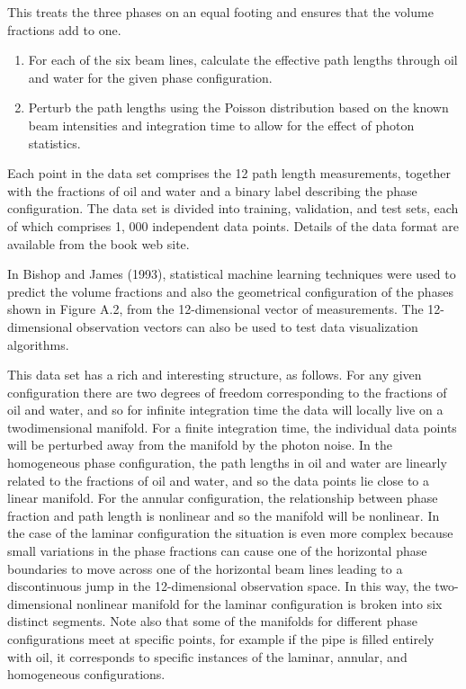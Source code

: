 \documentclass[
  10
]{article}
\begin{document}
This treats the three phases on an equal footing and ensures that the
volume fractions add to one.

\begin{enumerate}
\def\labelenumi{\arabic{enumi}.}
\setcounter{enumi}{2}
\item
  For each of the six beam lines, calculate the effective path lengths
  through oil and water for the given phase configuration.
\item
  Perturb the path lengths using the Poisson distribution based on the
  known beam intensities and integration time to allow for the effect of
  photon statistics.
\end{enumerate}

Each point in the data set comprises the 12 path length measurements,
together with the fractions of oil and water and a binary label
describing the phase configuration. The data set is divided into
training, validation, and test sets, each of which comprises 1, 000
independent data points. Details of the data format are available from
the book web site.

In Bishop and James (1993), statistical machine learning techniques were
used to predict the volume fractions and also the geometrical
configuration of the phases shown in Figure A.2, from the 12-dimensional
vector of measurements. The 12- dimensional observation vectors can also
be used to test data visualization algorithms.

This data set has a rich and interesting structure, as follows. For any
given configuration there are two degrees of freedom corresponding to
the fractions of oil and water, and so for infinite integration time the
data will locally live on a twodimensional manifold. For a finite
integration time, the individual data points will be perturbed away from
the manifold by the photon noise. In the homogeneous phase
configuration, the path lengths in oil and water are linearly related to
the fractions of oil and water, and so the data points lie close to a
linear manifold. For the annular configuration, the relationship between
phase fraction and path length is nonlinear and so the manifold will be
nonlinear. In the case of the laminar configuration the situation is
even more complex because small variations in the phase fractions can
cause one of the horizontal phase boundaries to move across one of the
horizontal beam lines leading to a discontinuous jump in the
12-dimensional observation space. In this way, the two-dimensional
nonlinear manifold for the laminar configuration is broken into six
distinct segments. Note also that some of the manifolds for different
phase configurations meet at specific points, for example if the pipe is
filled entirely with oil, it corresponds to specific instances of the
laminar, annular, and homogeneous configurations.
\end{document}
